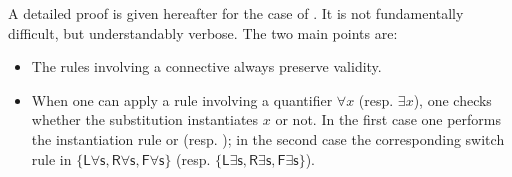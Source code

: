 A detailed proof is given hereafter for the case of . It is not
fundamentally difficult, but understandably verbose. The two main points are:
\begin{itemize}
\item The rules involving a connective always preserve validity.
\item When one can apply a rule involving a quantifier $\forall x$ (resp.
  $\exists x$), one checks whether the substitution instantiates $x$ or not. In
  the first case one performs the instantiation rule  or
   (resp. ); in the second case the
  corresponding switch rule in {\small $\{\mathsf{L\forall s}, \mathsf{R\forall
  s}, \mathsf{F\forall s}\}$} (resp. {\small $\{\mathsf{L\exists s},
  \mathsf{R\exists s}, \mathsf{F\exists s}\}$}).
\end{itemize}

